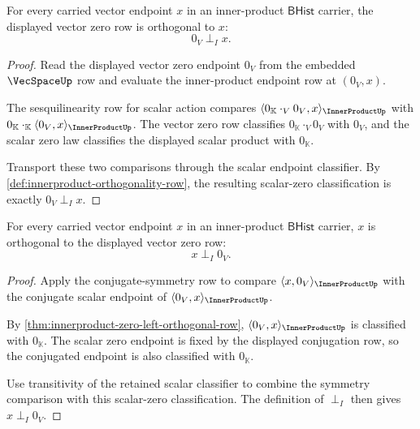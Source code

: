 \begin{theorem}
\label{thm:innerproduct-zero-left-orthogonal-row}
For every carried vector endpoint $x$ in an inner-product $\mathsf{BHist}$
carrier, the displayed vector zero row is orthogonal to $x$:
$$
0_V\perp_I x.
$$
\end{theorem}
\begin{proof}
Read the displayed vector zero endpoint $0_V$ from the embedded
$\VecSpaceUp$ row and evaluate the inner-product endpoint row at $(0_V,x)$.

The sesquilinearity row for scalar action compares
$\langle 0_{\mathbb{K}}\cdot_V 0_V,x\rangle_{\InnerProductUp}$ with
$0_{\mathbb{K}}\cdot_{\mathbb{K}}\langle 0_V,x\rangle_{\InnerProductUp}$.
The vector zero row classifies $0_{\mathbb{K}}\cdot_V 0_V$ with $0_V$, and
the scalar zero law classifies the displayed scalar product with
$0_{\mathbb{K}}$.

Transport these two comparisons through the scalar endpoint classifier.
By \autoref{def:innerproduct-orthogonality-row}, the resulting scalar-zero
classification is exactly $0_V\perp_I x$.
\end{proof}

\begin{theorem}
\label{thm:innerproduct-zero-right-orthogonal-row}
For every carried vector endpoint $x$ in an inner-product $\mathsf{BHist}$
carrier, $x$ is orthogonal to the displayed vector zero row:
$$
x\perp_I 0_V.
$$
\end{theorem}
\begin{proof}
Apply the conjugate-symmetry row to compare
$\langle x,0_V\rangle_{\InnerProductUp}$ with the conjugate scalar endpoint
of $\langle 0_V,x\rangle_{\InnerProductUp}$.

By \autoref{thm:innerproduct-zero-left-orthogonal-row},
$\langle 0_V,x\rangle_{\InnerProductUp}$ is classified with
$0_{\mathbb{K}}$. The scalar zero endpoint is fixed by the displayed
conjugation row, so the conjugated endpoint is also classified with
$0_{\mathbb{K}}$.

Use transitivity of the retained scalar classifier to combine the symmetry
comparison with this scalar-zero classification. The definition of
$\perp_I$ then gives $x\perp_I 0_V$.
\end{proof}

